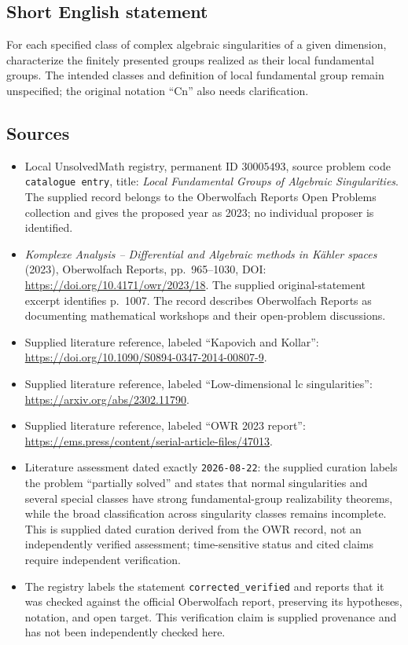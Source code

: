 \documentclass[11pt]{article}
\begin{document}
\subsection{Short English statement}
For each specified class of complex algebraic singularities of a given dimension, characterize the finitely presented groups realized as their local fundamental groups. The intended classes and definition of local fundamental group remain unspecified; the original notation ``Cn'' also needs clarification.
\subsection{Sources}
\begin{itemize}
\item Local UnsolvedMath registry, permanent ID $30005493$, source problem code \texttt{catalogue entry}, title: \emph{Local Fundamental Groups of Algebraic Singularities}. The supplied record belongs to the Oberwolfach Reports Open Problems collection and gives the proposed year as 2023; no individual proposer is identified.
\item \emph{Komplexe Analysis -- Differential and Algebraic methods in Kähler spaces} (2023), Oberwolfach Reports, pp.~965--1030, DOI: \url{https://doi.org/10.4171/owr/2023/18}. The supplied original-statement excerpt identifies p.~1007. The record describes Oberwolfach Reports as documenting mathematical workshops and their open-problem discussions.
\item Supplied literature reference, labeled ``Kapovich and Kollar'': \url{https://doi.org/10.1090/S0894-0347-2014-00807-9}.
\item Supplied literature reference, labeled ``Low-dimensional lc singularities'': \url{https://arxiv.org/abs/2302.11790}.
\item Supplied literature reference, labeled ``OWR 2023 report'': \url{https://ems.press/content/serial-article-files/47013}.
\item Literature assessment dated exactly \texttt{2026-08-22}: the supplied curation labels the problem ``partially solved'' and states that normal singularities and several special classes have strong fundamental-group realizability theorems, while the broad classification across singularity classes remains incomplete. This is supplied dated curation derived from the OWR record, not an independently verified assessment; time-sensitive status and cited claims require independent verification.
\item The registry labels the statement \texttt{corrected\_verified} and reports that it was checked against the official Oberwolfach report, preserving its hypotheses, notation, and open target. This verification claim is supplied provenance and has not been independently checked here.
\end{itemize}
\end{document}
